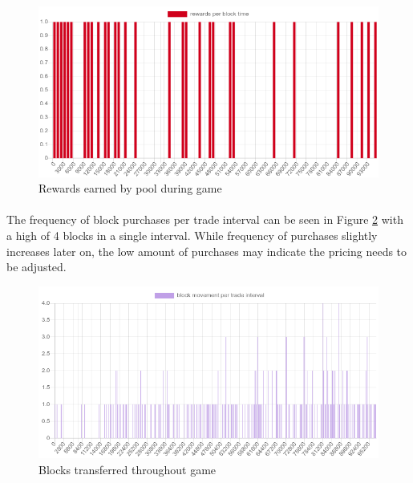 \begin{figure}[H]
  \centering
  \caption{Rewards earned by pool during game}
  \label{figure:rewards}
  \includegraphics[width=\linewidth]{media/fig-rewards}
\end{figure}

\paragraph{} The frequency of block purchases per trade interval can be seen in Figure \ref{figure:blocks} with a high of 4 blocks in a single interval. While frequency of purchases slightly increases later on, the low amount of purchases may indicate the pricing needs to be adjusted.

\begin{figure}[H]
  \centering
  \caption{Blocks transferred throughout game}
  \label{figure:blocks}
  \includegraphics[width=\linewidth]{media/fig-blocks}
\end{figure}